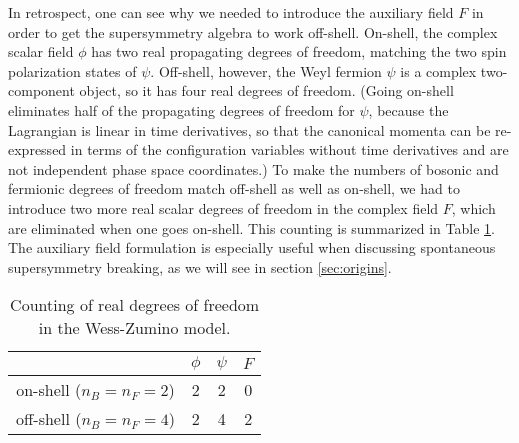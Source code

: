 \documentclass[12pt]{article}
\begin{document}
In retrospect, one can see why we needed to introduce the auxiliary field
$F$ in order to get the supersymmetry algebra to work off-shell. On-shell,
the complex scalar field $\phi$ has two real propagating degrees of
freedom, matching the two spin polarization states of $\psi$. Off-shell,
however, the Weyl fermion $\psi$ is a complex two-component object, so it
has four real degrees of freedom. (Going on-shell eliminates half of the
propagating degrees of freedom for $\psi$, because the Lagrangian is
linear in time derivatives, so that the canonical momenta can be
re-expressed in terms of the configuration variables without time
derivatives and are not independent phase space coordinates.) To make the
numbers of bosonic and fermionic degrees of freedom match off-shell as
well as on-shell, we had to introduce two more real scalar degrees of
freedom in the complex field $F$, which are eliminated when one goes
on-shell. This counting is summarized in Table \ref{table:WZdofcounting}. 
The auxiliary field formulation is especially useful when discussing
spontaneous supersymmetry breaking, as we will see in section
\ref{sec:origins}. 
\renewcommand{\arraystretch}{1.4}
\begin{table}[tb]
\begin{center}
\begin{tabular}{|c|c|c|c|}
\hline
 & $\phi$ & $\psi$ & $F$ \\
\hline
on-shell ($n_B=n_F=2$) & 2 & 2 & 0 \\
\hline
off-shell ($n_B=n_F=4$) & 2 & 4 & 2 \\
\hline
\end{tabular}
\caption{Counting of real degrees of freedom in the
Wess-Zumino model.\label{table:WZdofcounting}}
\vspace{-0.45cm}
\end{center}
\end{table}
\end{document}
